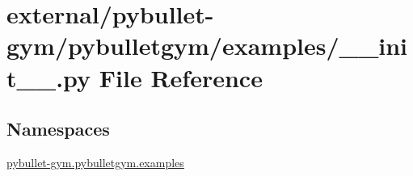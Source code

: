 \hypertarget{external_2pybullet-gym_2pybulletgym_2examples_2____init_____8py}{}\section{external/pybullet-\/gym/pybulletgym/examples/\+\_\+\+\_\+init\+\_\+\+\_\+.py File Reference}
\label{external_2pybullet-gym_2pybulletgym_2examples_2____init_____8py}
\subsection*{Namespaces}
\begin{DoxyCompactItemize}
\item 
 \hyperlink{namespacepybullet-gym_1_1pybulletgym_1_1examples}{pybullet-\/gym.\+pybulletgym.\+examples}
\end{DoxyCompactItemize}
